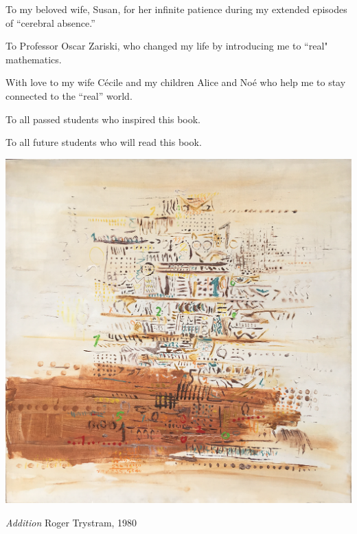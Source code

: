 %
%
%

\begin{dedication}
To my beloved wife, Susan, for her infinite patience during my extended episodes of ``cerebral absence.''

\smallskip

\noindent
To Professor Oscar Zariski, who changed my life by introducing me to ``real" mathematics.
\smallskip

\noindent
With love to my wife C\'ecile and my children Alice and No\'e who help me to stay connected to the ``real'' world. 
\bigskip

\noindent To all passed students who inspired this book.

\noindent To all future students who will read this book.
\end{dedication}

\vspace*{.25in}

\centerline{\includegraphics[scale=0.75]{AdditionForSpringer.png}}

\medskip

\centerline{{\large\em  Addition} \hspace*{4.5in} {\small Roger Trystram, 1980}}


